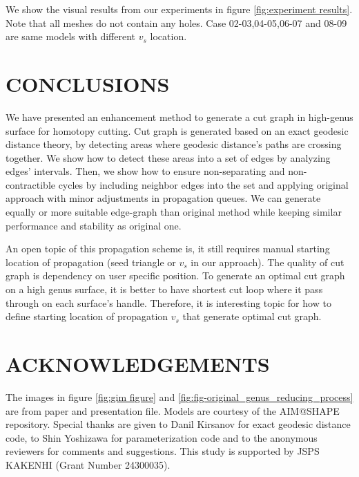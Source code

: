 \documentclass[a4paper,twoside]{article}
\begin{document}
We show the visual results from our experiments in figure \ref{fig:experiment results}. Note that all meshes do not contain any holes. Case 02-03,04-05,06-07 and 08-09 are same models with different $v_s$ location.

\section{\uppercase{Conclusions}}
\label{sec:conclusion}

\noindent We have presented an enhancement method to generate a cut graph in high-genus surface for homotopy cutting. Cut graph is generated based on an exact geodesic distance theory, by detecting areas where geodesic distance's paths are crossing together. We show how to detect these areas into a set of edges by analyzing edges' intervals. Then, we show how to ensure non-separating and non-contractible cycles by including neighbor edges into the set and applying original approach with minor adjustments in propagation queues. We can generate equally or more suitable edge-graph than original method while keeping similar performance and stability as original one.

An open topic of this propagation scheme is, it still requires manual starting location of propagation (seed triangle or $v_s$ in our approach). The quality of cut graph is dependency on user specific position.  To generate an optimal cut graph on a high genus surface, it is better to have shortest cut loop where it pass through on each surface's handle. Therefore, it is interesting topic for how to define starting location of propagation $v_s$ that generate optimal cut graph.


\section*{\uppercase{Acknowledgements}}
\noindent The images in figure \ref{fig:gim figure} and \ref{fig:fig-original_genus_reducing_process}  are from \cite{Gu:2002:GI:566654.566589} paper and presentation file. Models are courtesy of the AIM@SHAPE repository. Special thanks are given to Danil Kirsanov for exact geodesic distance code, to Shin Yoshizawa for parameterization code and to the anonymous reviewers for comments and suggestions.
This study is supported by JSPS KAKENHI (Grant Number 24300035).




{\small
}
\vfill
\end{document}
